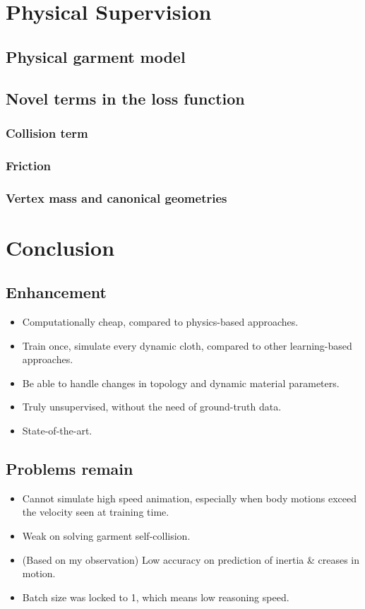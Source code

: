 \documentclass{article}
\begin{document}
\section{Physical Supervision}
\subsection{Physical garment model}
\subsection{Novel terms in the loss function}
\subsubsection{Collision term}
\subsubsection{Friction}
\subsubsection{Vertex mass and canonical geometries}
\section{Conclusion}
\subsection{Enhancement}
\begin{itemize}
    \item Computationally cheap, compared to physics-based approaches.
    \item Train once, simulate every dynamic cloth, compared to other learning-based approaches.
    \item Be able to handle changes in topology and dynamic material parameters.
    \item Truly unsupervised, without the need of ground-truth data.
    \item State-of-the-art.
\end{itemize}
\subsection{Problems remain}
\begin{itemize}
    \item Cannot simulate high speed animation, especially when body motions exceed the velocity seen at training time.
    \item Weak on solving garment self-collision.
    \item (Based on my observation) Low accuracy on prediction of inertia \& creases in motion.
    \item Batch size was locked to 1, which means low reasoning speed.
\end{itemize}
\end{document}
